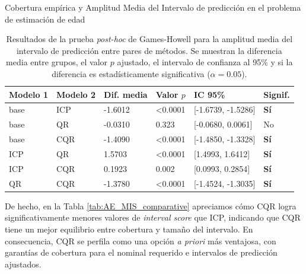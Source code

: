 \begin{StatisticsRef}{Cobertura empírica y Amplitud Media del Intervalo de predicción en el problema de estimación de edad}
%
\renewcommand{\arraystretch}{1.2}
\begin{table}[H]
    \small
    \centering
    \begin{tabular}{llllll}
    \toprule
    \textbf{Modelo 1} & \textbf{Modelo 2} & \textbf{Dif. media} & \textbf{Valor $p$} & \textbf{IC 95\%} & \textbf{Signif.} \\ 
    \hline
    base & ICP & -1.6012 & \textless 0.0001 & [-1.6739, -1.5286] & \textbf{Sí} \\
    base & QR & -0.0310 &  0.323 & [-0.0680, 0.0061] & No \\
    base & CQR & -1.4090 & \textless 0.0001 & [-1.4850, -1.3328] & \textbf{Sí} \\
    ICP & QR & 1.5703 & \textless 0.0001 & [1.4993, 1.6412] & \textbf{Sí} \\
    ICP & CQR & 0.1923 &  0.002 & [0.0993, 0.2854] & \textbf{Sí} \\
    QR & CQR & -1.3780 & \textless 0.0001 & [-1.4524, -1.3035] & \textbf{Sí} \\
    \bottomrule
    \end{tabular}
    \caption[
        Problema de estimación de edad: 
        Resultados de la prueba \textit{post-hoc} de Games-Howell para la amplitud media del intervalo de predicción entre pares de métodos.
    ]{
        Resultados de la prueba \textit{post-hoc} de Games-Howell para la amplitud media del intervalo de predicción entre pares de métodos.
        Se muestran la diferencia media entre grupos, el valor $p$ ajustado, el intervalo de confianza al 95\% y si la diferencia es estadísticamente significativa ($\alpha = 0.05$).
    }
    \label{tab:AE_games-howell_width}
\end{table}

\end{StatisticsRef}


De hecho, en la Tabla \ref{tab:AE_MIS_comparative} apreciamos cómo CQR logra significativamente menores valores de \textit{interval score} que ICP, indicando que CQR tiene un mejor equilibrio entre cobertura y tamaño del intervalo. En consecuencia, CQR se perfila como una opción \textit{a priori} más ventajosa, con garantías de cobertura para el nominal requerido e intervalos de predicción ajustados. 

